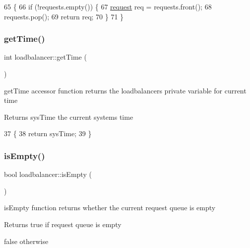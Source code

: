 \begin{DoxyCode}
65                                  \{
66     \textcolor{keywordflow}{if} (!requests.empty()) \{
67         \hyperlink{structrequest}{request} req = requests.front();
68         requests.pop();
69         \textcolor{keywordflow}{return} req;
70     \}
71 \}
\end{DoxyCode}
\mbox{\label{classloadbalancer_afc308893c7ab0fc8b92036deae7a2de9}} 
\subsubsection{\texorpdfstring{get\+Time()}{getTime()}}
{\footnotesize\ttfamily int loadbalancer\+::get\+Time (\begin{DoxyParamCaption}{ }\end{DoxyParamCaption})}

get\+Time accessor function returns the loadbalancer\textquotesingle{}s private variable for current time \begin{DoxyReturn}{Returns}
sys\+Time the current system\textquotesingle{}s time 
\end{DoxyReturn}

\begin{DoxyCode}
37                           \{
38     \textcolor{keywordflow}{return} sysTime;
39 \}
\end{DoxyCode}
\mbox{\label{classloadbalancer_a542b0b5b5759c074e3e8d1cbf1f33b52}} 
\subsubsection{\texorpdfstring{is\+Empty()}{isEmpty()}}
{\footnotesize\ttfamily bool loadbalancer\+::is\+Empty (\begin{DoxyParamCaption}{ }\end{DoxyParamCaption})}

is\+Empty function returns whether the current request queue is empty \begin{DoxyReturn}{Returns}
true if request queue is empty 

false otherwise 
\end{DoxyReturn}

